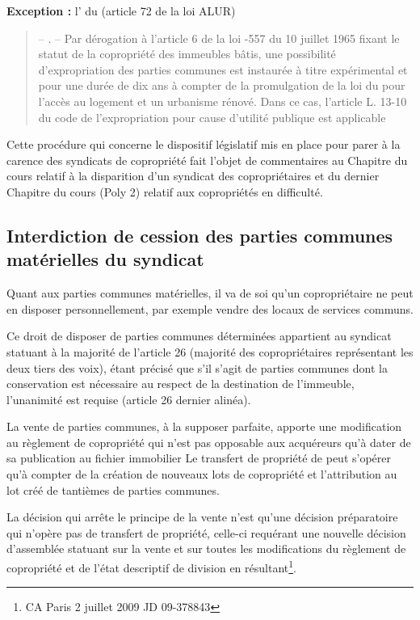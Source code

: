 		\textbf{Exception :} l’ du \CCH{} (article 72 de la loi ALUR)
		\begin{quote}
			– \I. – Par dérogation à l’article 6 de la loi -557 du 10 juillet 1965 fixant le statut de la copropriété des
			immeubles bâtis, une possibilité d’expropriation des parties communes est instaurée à titre expérimental
			et pour une durée de dix ans à compter de la promulgation de la loi \no du pour l’accès au logement
			et un urbanisme rénové. Dans ce cas, l’article L. 13-10 du code de l’expropriation pour cause d’utilité
			publique est applicable
		\end{quote}
		
		Cette procédure qui concerne le dispositif législatif mis en place pour parer à la carence des
		syndicats de copropriété fait l’objet de commentaires au Chapitre du cours relatif à la disparition
		d’un syndicat des copropriétaires et du dernier Chapitre du cours (Poly 2) relatif aux copropriétés
		en difficulté.
	
	\subsection{Interdiction de cession des parties communes matérielles du syndicat}
	
		Quant aux parties communes matérielles, il va de soi qu'un copropriétaire ne peut en disposer
		personnellement, par exemple vendre des locaux de services communs.
		
		Ce droit de disposer de parties communes déterminées appartient au syndicat statuant à la majorité de
		l'article 26 (majorité des copropriétaires représentant les deux tiers des voix), étant précisé que s'il s'agit
		de parties communes dont la conservation est nécessaire au respect de la destination de l'immeuble,
		l'unanimité est requise (article 26 dernier alinéa).
		
		La vente de parties communes, à la supposer parfaite, apporte une modification au règlement de
		copropriété qui n’est pas opposable aux acquéreurs qu’à dater de sa publication au fichier immobilier
		Le transfert de propriété de peut s’opérer qu’à compter de la création de nouveaux lots de copropriété et
		l’attribution au lot créé de tantièmes de parties communes.
		
		La décision qui arrête le principe de la vente n’est qu’une décision préparatoire qui n’opère pas de
		transfert de propriété, celle-ci requérant une nouvelle décision d’assemblée statuant sur la vente et sur
		toutes les modifications du règlement de copropriété et de l’état descriptif de division en résultant\footnote{CA Paris 2 juillet 2009 JD 09-378843}.
	
